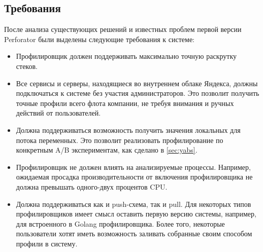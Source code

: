 \subsection{Требования}
После анализа существующих решений и известных проблем первой версии Perforator были выделены следующие требования к системе:
\begin{itemize}
    \item
        Профилировщик должен поддерживать максимально точную раскрутку стеков.

    \item
        Все сервисы и серверы, находящиеся во внутреннем облаке Яндекса, должны подключаться к системе без участия администраторов.
        Это позволит получить точные профили всего флота компании, не требуя внимания и ручных действий от пользователей.

    \item
        Должна поддерживаться возможность получить значения локальных для потока переменных.
        Это позволит реализовать профилирование по конкретным A/B экспериментам, как сделано в \ref{sec:yabs}.

    \item
        Профилировщик не должен влиять на анализируемые процессы.
        Например, ожидаемая просадка производительности от включения профилировщика не должна превышать одного-двух процентов CPU.

    \item
        Должна поддерживаться как и push-схема, так и pull.
        Для некоторых типов профилировщиков имеет смысл оставить первую версию системы, например, для встроенного в Golang профилировщика.
        Более того, некоторые пользователи хотят иметь возможность заливать собранные своим способом профили в систему.
\end{itemize}

